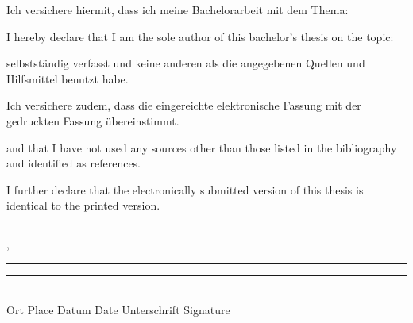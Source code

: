 \vfill
\begin{paracol}{2}
    \begin{leftcolumn}
        Ich versichere hiermit, dass ich meine Bachelorarbeit mit dem Thema:
    \end{leftcolumn}
    
    \begin{rightcolumn}
        \color{gray}
        I hereby declare that I am the sole author of this bachelor's thesis on the topic:
    \end{rightcolumn}
\end{paracol}

\begin{center}
    \vspace{1cm}
    \textit{\@title}
    \vspace{1cm}
\end{center}

\begin{paracol}{2}
    \begin{leftcolumn}
        selbstständig verfasst und keine anderen als die angegebenen Quellen und Hilfsmittel benutzt habe. 
        
        Ich versichere zudem, dass die eingereichte elektronische Fassung mit der gedruckten Fassung \"ubereinstimmt.
    \end{leftcolumn}
    
    \begin{rightcolumn}
        \color{gray}
        and that I have not used any sources other than those listed in the bibliography and identified as references. 
        
        I further declare that the electronically submitted version of this thesis is identical to the printed version.
    \end{rightcolumn}
    
\end{paracol}

\vfill

\rule{3,5cm}{0.4pt}, \rule{3,5cm}{0.4pt} \hspace{0.38cm} \rule{7cm}{0.4pt}\\
Ort {\color{gray}Place}
\hspace{1.8cm}
Datum {\color{gray}Date}
\hspace{1.6cm}
Unterschrift {\color{gray}Signature}



\vfill